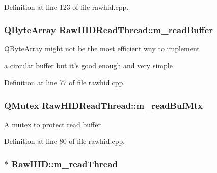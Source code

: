Definition at line 123 of file rawhid.\-cpp.

\hypertarget{group___raw_h_i_d_plugin_gaab5037bdcaa413fed7fea8c575861b1b}{
\subsubsection[{m\-\_\-read\-Buffer}]{\setlength{\rightskip}{0pt plus 5cm}Q\-Byte\-Array Raw\-H\-I\-D\-Read\-Thread\-::m\-\_\-read\-Buffer\hspace{0.3cm}{\ttfamily [protected]}}}\label{group___raw_h_i_d_plugin_gaab5037bdcaa413fed7fea8c575861b1b}
\begin{DoxyVerb}QByteArray might not be the most efficient way to implement
\end{DoxyVerb}
 a circular buffer but it's good enough and very simple 

Definition at line 77 of file rawhid.\-cpp.

\hypertarget{group___raw_h_i_d_plugin_ga5b3754efb963cd7171d34683320c01eb}{
\subsubsection[{m\-\_\-read\-Buf\-Mtx}]{\setlength{\rightskip}{0pt plus 5cm}Q\-Mutex Raw\-H\-I\-D\-Read\-Thread\-::m\-\_\-read\-Buf\-Mtx\hspace{0.3cm}{\ttfamily [protected]}}}\label{group___raw_h_i_d_plugin_ga5b3754efb963cd7171d34683320c01eb}
A mutex to protect read buffer 

Definition at line 80 of file rawhid.\-cpp.

\hypertarget{group___raw_h_i_d_plugin_gaecb703f979aac429ee3961f52c998b53}{
\subsubsection[{m\-\_\-read\-Thread}]{$\ast$ Raw\-H\-I\-D\-::m\-\_\-read\-Thread\hspace{0.3cm}{\ttfamily [protected]}}}\label{group___raw_h_i_d_plugin_gaecb703f979aac429ee3961f52c998b53}


